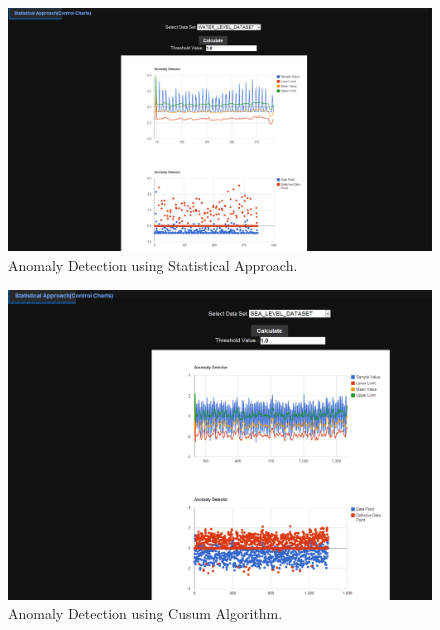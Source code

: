 \documentclass[12pt]{report}
\begin{document}
\begin{figure}[h!]
  
  \centering
    \includegraphics[scale=0.350]{./screenshots/ano_stat_app.png}
\caption{Anomaly Detection using Statistical Approach.}
\end{figure}

\begin{figure}[h!]
  
  \centering
    \includegraphics[scale=0.350]{./screenshots/ano_stat_app_2.png}
\caption{Anomaly Detection using Cusum Algorithm.}
\end{figure}
\end{document}

